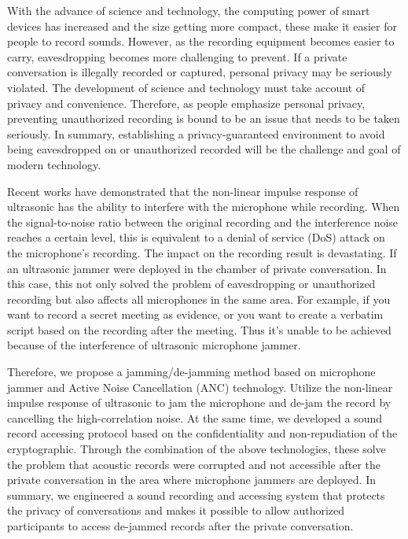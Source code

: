 \begin{abstract*}

    With the advance of science and technology,
the computing power of smart devices has increased
and the size getting more compact,
these make it easier for people to record sounds.
However, as the recording equipment becomes easier to carry,
eavesdropping becomes more challenging to prevent.
If a private conversation is illegally recorded or captured,
personal privacy may be seriously violated.
The development of science and technology must take account of privacy and convenience.
Therefore, as people emphasize personal privacy,
preventing unauthorized recording is bound to be an issue that needs to be taken seriously.
In summary, establishing a privacy-guaranteed environment
to avoid being eavesdropped on or unauthorized recorded
will be the challenge and goal of modern technology.

    Recent works have demonstrated that the non-linear impulse response of ultrasonic
has the ability to interfere with the microphone while recording.
When the signal-to-noise ratio between the original recording
and the interference noise reaches a certain level,
this is equivalent to a denial of service (DoS) attack on the microphone's recording.
The impact on the recording result is devastating.
If an ultrasonic jammer were deployed in the chamber of private conversation.
In this case, this not only solved the problem of eavesdropping or unauthorized recording
but also affects all microphones in the same area.
For example, if you want to record a secret meeting as evidence,
or you want to create a verbatim script based on the recording after the meeting.
Thus it's unable to be achieved because of the interference of ultrasonic microphone jammer.

    Therefore, we propose a jamming/de-jamming method
based on microphone jammer and Active Noise Cancellation (ANC) technology.
Utilize the non-linear impulse response of ultrasonic to jam the microphone
and de-jam the record by cancelling the high-correlation noise.
At the same time, we developed a sound record accessing protocol
based on the confidentiality and non-repudiation of the cryptographic.
Through the combination of the above technologies,
these solve the problem that acoustic records were corrupted and not accessible
after the private conversation in the area where microphone jammers are deployed.
In summary, we engineered a sound recording and accessing system
that protects the privacy of conversations
and makes it possible to allow authorized participants
to access de-jammed records after the private conversation.

\end{abstract*}